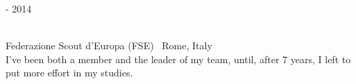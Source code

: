 \bigskip

\begin{minipage}{.3\textwidth}
	 - 2014 \faCalendar
\end{minipage}
\hfill
\begin{minipage}{.64\textwidth}
	\vfill
	 \\
	\color{Maroon} Federazione Scout d'Europa (FSE) \color{Sepia} \hfill \faMapMarker \ Rome, Italy
	\smallskip
	\\
	\color{gray} I've been both a member and the leader of my team, until, after 7 years, I left to put more effort in my studies.
	\vfill
\end{minipage}